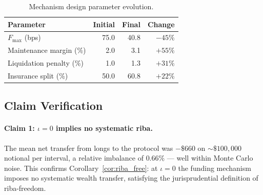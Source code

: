 \documentclass[10pt,twocolumn]{article}
\theoremstyle{plain}
\theoremstyle{definition}
\begin{document}
\begin{table}[t]
\centering
\caption{Per-episode simulation outcomes.}
\label{tab:sim_episodes}
\end{table}

\begin{table}[t]
\centering
\caption{Mechanism design parameter evolution.}
\label{tab:sim_params}
\small
\begin{tabular}{lrrr}
\toprule
Parameter & Initial & Final & Change \\
\midrule
$F_{\max}$ (bps)          & 75.0 & 40.8 & $-45\%$ \\
Maintenance margin (\%)    &  2.0 &  3.1 & $+55\%$ \\
Liquidation penalty (\%)   &  1.0 &  1.3 & $+31\%$ \\
Insurance split (\%)       & 50.0 & 60.8 & $+22\%$ \\
\bottomrule
\end{tabular}
\end{table}

\subsection{Claim Verification}

\paragraph{Claim 1: $\iota=0$ implies no systematic riba.}
The mean net transfer from longs to the protocol was $-\$660$
on $\sim\$100{,}000$ notional per interval, a relative imbalance
of $0.66\%$ --- well within Monte Carlo noise. This confirms
Corollary~\ref{cor:riba_free}: at $\iota=0$ the funding mechanism
imposes no systematic wealth transfer, satisfying the
jurisprudential definition of riba-freedom.
\end{document}
